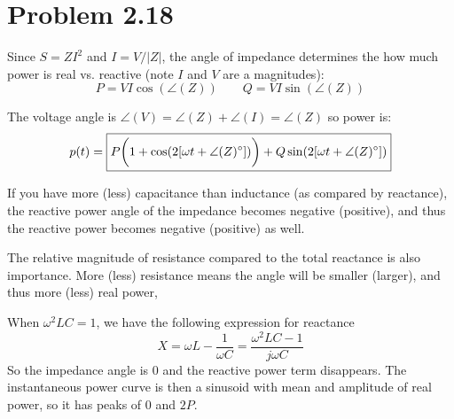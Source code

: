 \documentclass{homework}
\begin{document}
\section{Problem 2.18}
\begin{letterenum}
    \item Since $S = Z I^2$ and $I = V / |Z|$, the angle of impedance determines
        the how much power is real vs. reactive (note $I$ and $V$ are a magnitudes):
        \begin{equation*}
            \boxed{P = VI \cos(\angle(Z)) \qquad Q = VI \sin(\angle(Z))}
        \end{equation*}
    \item The voltage angle is $\angle(V) = \angle(Z) + \angle(I) = \angle(Z)$
    so power is:
    \begin{equation*}
        p(t) = \boxed{P \biggl( 1 + \cos(2[\omega t + \angle(Z) \degree]) \biggr) + Q \sin(2[\omega t + \angle(Z) \degree])}
    \end{equation*}

    \item If you have more (less) capacitance than inductance
        (as compared by reactance), the reactive power
        angle of the impedance becomes negative (positive), and thus
        the reactive power becomes negative (positive) as well.

        The relative magnitude of resistance compared to the total
        reactance is also importance. More (less) resistance
        means the angle will be smaller (larger), and thus more
        (less) real power,

        When $\omega^2LC = 1$, we have the following expression for
        reactance
        \begin{equation*}
            X = \omega L - \frac{1}{\omega C}
                = \frac{\omega^2 LC - 1}{j \omega C}
        \end{equation*}
        So the impedance angle is 0 and the reactive power term
        disappears. The instantaneous power curve is then a 
        sinusoid with mean and amplitude of real power, so it
        has peaks of 0 and $2P$.
\end{letterenum}
\end{document}
